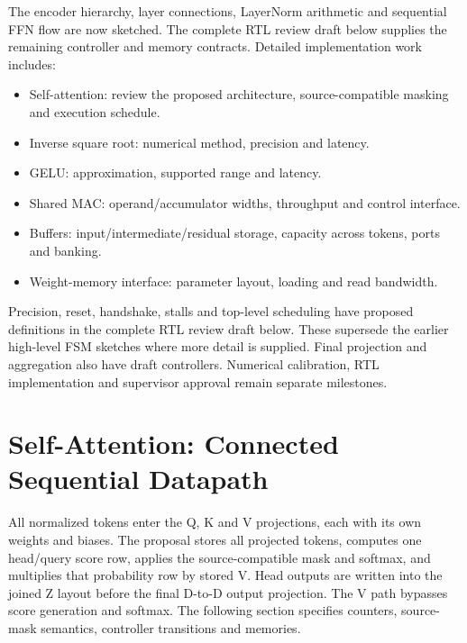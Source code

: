 \documentclass[11pt,a4paper]{article}
\begin{document}
The encoder hierarchy, layer connections, LayerNorm arithmetic and sequential
FFN flow are now sketched. The complete RTL review draft below supplies the
remaining controller and memory contracts. Detailed implementation work includes:
\begin{itemize}
\item Self-attention: review the proposed architecture, source-compatible masking and execution schedule.
\item Inverse square root: numerical method, precision and latency.
\item GELU: approximation, supported range and latency.
\item Shared MAC: operand/accumulator widths, throughput and control interface.
\item Buffers: input/intermediate/residual storage, capacity across tokens, ports and banking.
\item Weight-memory interface: parameter layout, loading and read bandwidth.
\end{itemize}
Precision, reset, handshake, stalls and top-level scheduling have proposed
definitions in the complete RTL review draft below. These supersede the earlier
high-level FSM sketches where more detail is supplied. Final projection and
aggregation also have draft controllers. Numerical calibration, RTL implementation
and supervisor approval remain separate milestones.

\section{Self-Attention: Connected Sequential Datapath}

All normalized tokens enter the Q, K and V projections, each with its own
weights and biases. The proposal stores all projected tokens, computes one
head/query score row, applies the source-compatible mask and softmax, and
multiplies that probability row by stored V. Head outputs are written into
the joined Z layout before the final D-to-D output projection.
The V path bypasses score generation and softmax. The following section
specifies counters, source-mask semantics, controller transitions and memories.

\begin{center}
\end{center}
\end{document}
